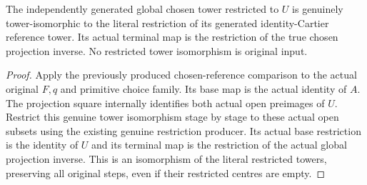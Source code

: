 \begin{lemma}
\label{hir:nc-ordered-choice-open-literal-reference}
\leanok
{}
The independently generated global chosen tower restricted to $U$ is genuinely tower-isomorphic to the literal restriction of its generated identity-Cartier reference tower. Its actual terminal map is the restriction of the true chosen projection inverse. No restricted tower isomorphism is original input.
\end{lemma}
\begin{proof}
Apply the previously produced chosen-reference comparison to the actual original $F,q$ and primitive choice family. Its base map is the actual identity of $A$. The projection square internally identifies both actual open preimages of $U$. Restrict this genuine tower isomorphism stage by stage to these actual open subsets using the existing genuine restriction producer. Its actual base restriction is the identity of $U$ and its terminal map is the restriction of the actual global projection inverse. This is an isomorphism of the literal restricted towers, preserving all original steps, even if their restricted centres are empty.
\end{proof}

